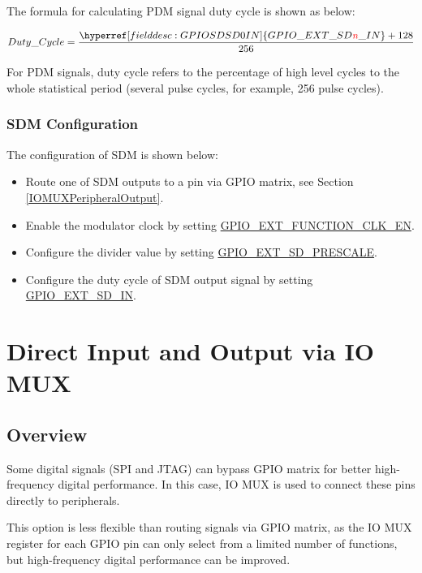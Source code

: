 \documentclass[main\_\_EN.tex]{subfiles}
\begin{document}
The formula for calculating PDM signal duty cycle is shown as below:

    \[
    Duty\_Cycle=\frac{\hyperref[fielddesc:GPIOSDSD0IN]{GPIO\_EXT\_SD\regindex{n}\_IN} + 128} {256}
    \]

\begin{tiplisting}
For PDM signals, duty cycle refers to the percentage of high level cycles to the whole statistical period (several pulse cycles, for example, 256 pulse cycles).
\end{tiplisting}

\subsubsection{SDM Configuration}

The configuration of SDM is shown below:

\begin{itemize}
    \item Route one of SDM outputs to a pin via GPIO matrix, see Section  \ref{IOMUXPeripheralOutput}.
    \item Enable the modulator clock by setting  \hyperref[fielddesc:GPIOSDFUNCTIONCLKEN]{GPIO\_EXT\_FUNCTION\_CLK\_EN}.
    \item Configure the divider value by setting  \hyperref[fielddesc:GPIOSDSD0PRESCALE]{GPIO\_EXT\_SD\_PRESCALE}.
    \item Configure the duty cycle of SDM output signal by setting  \hyperref[fielddesc:GPIOSDSD0IN]{GPIO\_EXT\_SD\_IN}.
\end{itemize}

\section{Direct Input and Output via IO MUX}

\subsection{Overview}

Some digital signals (SPI and JTAG) can bypass GPIO matrix for better high-frequency digital performance. In this case, IO MUX is used to connect these pins directly to peripherals.

This option is less flexible than routing signals via GPIO matrix, as the IO MUX register for each GPIO pin can only select from a limited number of functions, but high-frequency digital performance can be improved.
\end{document}
